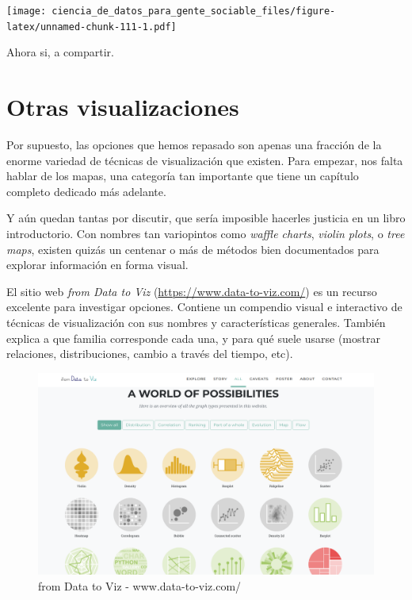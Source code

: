 \documentclass[spanish,]{book}
\begin{document}
\texttt{[image: ciencia\_de\_datos\_para\_gente\_sociable\_files/figure-latex/unnamed-chunk-111-1.pdf]}

Ahora si, a compartir.

\hypertarget{otras-visualizaciones}{%
\section{Otras visualizaciones}\label{otras-visualizaciones}}

Por supuesto, las opciones que hemos repasado son apenas una fracción de la enorme variedad de técnicas de visualización que existen. Para empezar, nos falta hablar de los mapas, una categoría tan importante que tiene un capítulo completo dedicado más adelante.

Y aún quedan tantas por discutir, que sería imposible hacerles justicia en un libro introductorio. Con nombres tan variopintos como \emph{waffle charts}, \emph{violin plots}, o \emph{tree maps}, existen quizás un centenar o más de métodos bien documentados para explorar información en forma visual.

El sitio web \emph{from Data to Viz} (\url{https://www.data-to-viz.com/}) es un recurso excelente para investigar opciones. Contiene un compendio visual e interactivo de técnicas de visualización con sus nombres y características generales. También explica a que familia corresponde cada una, y para qué suele usarse (mostrar relaciones, distribuciones, cambio a través del tiempo, etc).

\begin{figure}
\includegraphics[width=1\linewidth]{imagenes/data_to_viz} \caption{from Data to Viz - www.data-to-viz.com/}\label{fig:unnamed-chunk-112}
\end{figure}
\end{document}
